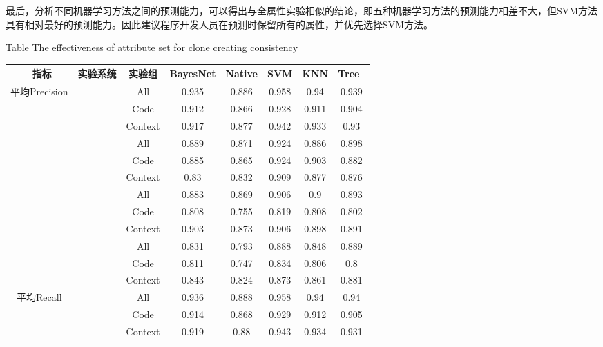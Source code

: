 最后，分析不同机器学习方法之间的预测能力，可以得出与全属性实验相似的结论，即五种机器学习方法的预测能力相差不大，但SVM方法具有相对最好的预测能力。因此建议程序开发人员在预测时保留所有的属性，并优先选择SVM方法。


\begin{table} [htbp]
\renewcommand\arraystretch{0.9} 
{Table$\!$}
{The effectiveness of attribute set for clone creating consistency}
\vspace{0.5em}
\centering
\wuhao
\begin{tabular}{cccccccc}
\toprule[1.5pt]
~{指标}&{实验系统}&{实验组}&{BayesNet}&{Native}&{SVM}&{KNN}&{Tree}~\\
\midrule[1pt]
\multirow{12}{*}{平均Precision}
&~\multirow{3}{*}{ArgoUML}
		&All     & 0.935    & 0.886  & 0.958 & 0.94  & 0.939 \\
		& & Code    & 0.912    & 0.866  & 0.928 & 0.911 & 0.904 \\
		&  & Context & 0.917    & 0.877  & 0.942 & 0.933 & 0.93  \\
\cline{2-8}
&~\multirow{3}{*}{jEdit}
            & All     & 0.889    & 0.871  & 0.924 & 0.886 & 0.898 \\
            &       & Code    & 0.885    & 0.865  & 0.924 & 0.903 & 0.882 \\
            &            & Context & 0.83     & 0.832  & 0.909 & 0.877 & 0.876 \\
\cline{2-8}
&~\multirow{3}{*}{jFreeChart}
                    & All     & 0.883    & 0.869  & 0.906 & 0.9   & 0.893 \\
            &  & Code    & 0.808    & 0.755  & 0.819 & 0.808 & 0.802 \\
            &            & Context & 0.903    & 0.873  & 0.906 & 0.898 & 0.891 \\
\cline{2-8}
&~\multirow{3}{*}{Tuxguitar} 
            &      All     & 0.831    & 0.793  & 0.888 & 0.848 & 0.889 \\
            &   & Code    & 0.811    & 0.747  & 0.834 & 0.806 & 0.8   \\
            &            & Context & 0.843    & 0.824  & 0.873 & 0.861 & 0.881 \\
\hline
\multirow{12}{*}{平均Recall}&
~\multirow{3}{*}{ArgoUML}
            &All     & 0.936    & 0.888  & 0.958 & 0.94  & 0.94  \\
            &   & Code    & 0.914    & 0.868  & 0.929 & 0.912 & 0.905 \\
            &            & Context & 0.919    & 0.88   & 0.943 & 0.934 & 0.931 \\

\end{tabular}
\end{table}
